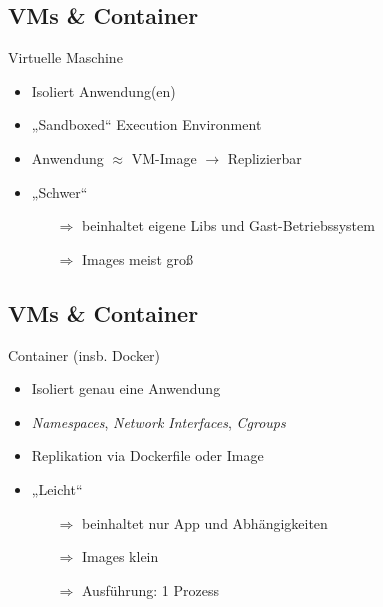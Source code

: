 \documentclass{beamer}
\begin{document}
\subsection{VMs \& Container}
\begin{frame}{\insertsubsection}
	Virtuelle Maschine
	\begin{itemize}
		\setlength\itemsep{1em}
		\item Isoliert Anwendung(en)
		\item „Sandboxed“ Execution Environment
		\item Anwendung $\approx$ VM-Image $\rightarrow$ Replizierbar
		\item „Schwer“
		\begin{itemize}
			\item[$\Rightarrow$] beinhaltet eigene Libs und Gast-Betriebssystem
			\item[$\Rightarrow$] Images meist groß
		\end{itemize}
	\end{itemize}
\end{frame}

\subsection{VMs \& Container}
\begin{frame}{\insertsubsection}
	Container (insb. Docker)
	\begin{itemize}
		\setlength\itemsep{1em}
		\item Isoliert genau eine Anwendung
		\item \textit{Namespaces}, \textit{Network Interfaces}, \textit{Cgroups}
		\item Replikation via Dockerfile oder Image
		\item „Leicht“
		\begin{itemize}
			\item[$\Rightarrow$] beinhaltet nur App und Abhängigkeiten
			\item[$\Rightarrow$] Images klein
			\item[$\Rightarrow$] Ausführung: 1 Prozess
		\end{itemize}
	\end{itemize}
\end{frame}
\end{document}
